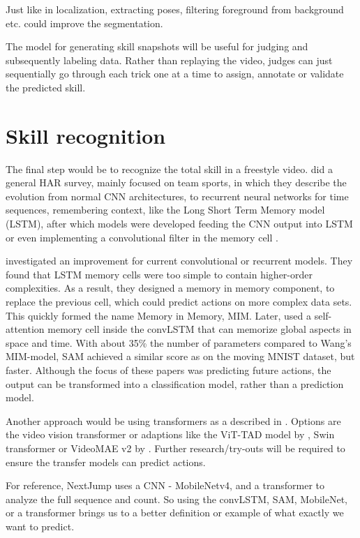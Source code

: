Just like in localization, extracting poses, filtering foreground from background etc. could improve the segmentation.

The model for generating skill snapshots will
be useful for judging and subsequently labeling
data. Rather than replaying the video, judges can
just sequentially go through each trick one at a
time to assign, annotate or validate the predicted
skill.




\section{Skill recognition}
\label{lit:skill-recognition}

The final step would be to recognize the total skill in a freestyle video.
\textcite{Yin_2024} did a general HAR survey, mainly focused on team sports, in which they describe the evolution from normal CNN architectures, to recurrent neural networks for time sequences, remembering context, like the Long Short Term Memory model (LSTM), after which models were developed feeding the CNN output into LSTM or even implementing a convolutional filter in the memory cell \autocite{Shi_2015}.

\textcite{Wang_2019} investigated an improvement for current convolutional or recurrent models. They found that LSTM memory cells were too simple to contain higher-order complexities. As a result, they designed a memory in memory component, to replace the previous cell, which could predict actions on more complex data sets. This quickly formed the name Memory in Memory, MIM. Later, \textcite{Lin_2020} used a self-attention memory cell inside the convLSTM that can memorize global aspects in space and time. With about 35\% the number of parameters compared to Wang's MIM-model, SAM achieved a similar score as on the moving MNIST dataset, but faster. Although the focus of these papers was predicting future actions, the output can be transformed into a classification model, rather than a prediction model.

Another approach would be using transformers as a described  in \textcite{Yin_2024}. Options are the video vision transformer \autocite{Arnab2021} or adaptions like the ViT-TAD model by \textcite{Yang_2023}, Swin transformer \textcite{Liu_2021} or VideoMAE v2 by \textcite{Wang_2023}. Further research/try-outs will be required to ensure the transfer models can predict actions.

For reference, NextJump uses a CNN - MobileNetv4, \autocite{MobileNetv4_2024} and a transformer to analyze the full sequence and count. So using the convLSTM, SAM, MobileNet, or a transformer brings us to a better definition or example of what exactly we want to predict.

